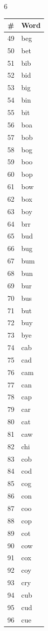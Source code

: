 \documentclass[11pt,a4paper]{article}
\begin{document}
\begin{multicols}{6}
\columnbreak

\begin{tabular}{cl}
\toprule
\# & Word \\
\midrule
49 & beg \\
50 & bet \\
51 & bib \\
52 & bid \\
53 & big \\
54 & bin \\
55 & bit \\
56 & boa \\
57 & bob \\
58 & bog \\
59 & boo \\
60 & bop \\
61 & bow \\
62 & box \\
63 & boy \\
64 & brr \\
65 & bud \\
66 & bug \\
67 & bum \\
68 & bun \\
69 & bur \\
70 & bus \\
71 & but \\
72 & buy \\
73 & bye \\
74 & cab \\
75 & cad \\
76 & cam \\
77 & can \\
78 & cap \\
79 & car \\
80 & cat \\
81 & caw \\
82 & chi \\
83 & cob \\
84 & cod \\
85 & cog \\
86 & con \\
87 & coo \\
88 & cop \\
89 & cot \\
90 & cow \\
91 & cox \\
92 & coy \\
93 & cry \\
94 & cub \\
95 & cud \\
96 & cue \\
\bottomrule
\end{tabular}


\end{multicols}
\end{document}
